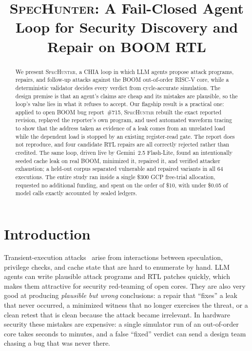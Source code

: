 \documentclass[conference,10pt]{IEEEtran}
\newcommand{\sh}{\textsc{SpecHunter}}
\begin{document}
\title{\sh{}: A Fail-Closed Agent Loop for Security Discovery and Repair on BOOM RTL}

\author{
\and
{}
\and
{}
}

\maketitle

\begin{abstract}
We present \sh{}, a CHIA loop in which LLM agents propose attack programs,
repairs, and follow-up attacks against the BOOM out-of-order RISC-V core, while a
deterministic validator decides every verdict from cycle-accurate simulation.
The design premise is that an agent's claims are cheap and its mistakes are
plausible, so the loop's value lies in what it refuses to accept. Our flagship
result is a practical one: applied to open BOOM bug report~\#715, \sh{} rebuilt
the exact reported revision, replayed the reporter's own program, and used
automated waveform tracing to show that the address taken as evidence of a leak
comes from an unrelated load while the dependent load is stopped by an existing
register-read gate. The report does not reproduce, and four candidate RTL repairs
are all correctly rejected rather than credited. The same loop, driven live by
Gemini~2.5 Flash-Lite, found an intentionally seeded cache leak on real BOOM,
minimized it, repaired it, and verified attacker exhaustion; a held-out corpus
separated vulnerable and repaired variants in all 64 executions. The entire study
ran inside a single \$300 GCP free-trial allocation, requested no additional
funding, and spent on the order of \$10, with under \$0.05 of model calls exactly
accounted by sealed ledgers.
\end{abstract}

\section{Introduction}
Transient-execution attacks~\cite{spectre,meltdown} arise from interactions
between speculation, privilege checks, and cache state that are hard to
enumerate by hand. LLM agents can write plausible attack programs and RTL
patches quickly, which makes them attractive for security red-teaming of
open cores. They are also very good at producing \emph{plausible but wrong}
conclusions: a repair that ``fixes'' a leak that never occurred, a minimized
witness that no longer exercises the threat, or a clean retest that is clean
because the attack became irrelevant. In hardware security these mistakes are
expensive: a single simulator run of an out-of-order core takes seconds to
minutes, and a false ``fixed'' verdict can send a design team chasing a bug that
was never there.
\end{document}
